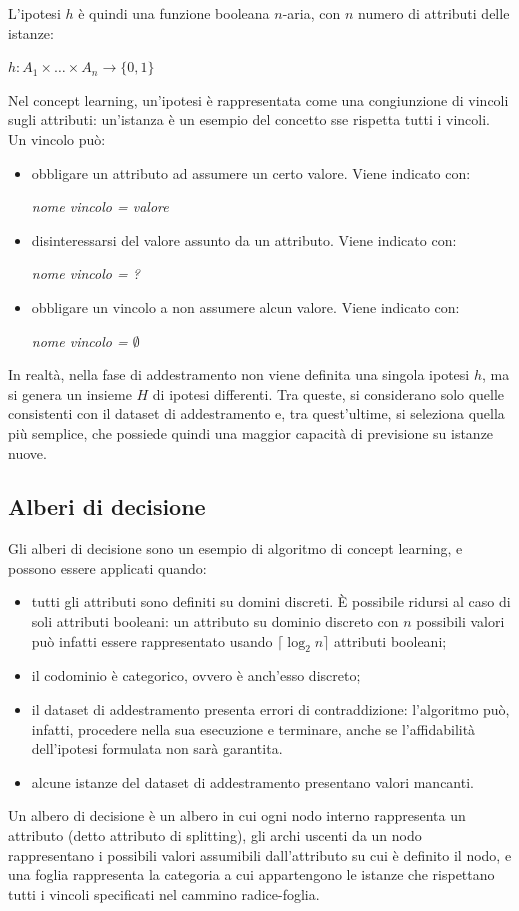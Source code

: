 L'ipotesi $h$ è quindi una funzione booleana $n$-aria, con $n$ numero di attributi delle istanze: 
\begin{center}
    $h: A_1 \times \ldots \times A_n \rightarrow \{ 0, 1 \}$
\end{center}
Nel concept learning, un'ipotesi è rappresentata come una congiunzione di vincoli sugli attributi: un'istanza è un esempio del concetto sse rispetta tutti i vincoli.
Un vincolo può:
\begin{itemize}
    \item obbligare un attributo ad assumere un certo valore. Viene indicato con:
    \begin{center}
        \textit{nome vincolo = valore}
    \end{center}
    \item disinteressarsi del valore assunto da un attributo. Viene indicato con:
    \begin{center}
        \textit{nome vincolo = ?}
    \end{center} 
    \item obbligare un vincolo a non assumere alcun valore. Viene indicato con:
    \begin{center}
        \textit{nome vincolo = $\emptyset$}
    \end{center}
\end{itemize}
In realtà, nella fase di addestramento non viene definita una singola ipotesi $h$, ma si genera un insieme $H$ di ipotesi differenti.
Tra queste, si considerano solo quelle consistenti con il dataset di addestramento e, tra quest'ultime, si seleziona quella più semplice, che possiede quindi una maggior capacità di previsione su istanze nuove.

\subsection{Alberi di decisione}
Gli alberi di decisione sono un esempio di algoritmo di concept learning, e possono essere applicati quando:
\begin{itemize}
    \item tutti gli attributi sono definiti su domini discreti. È possibile ridursi al caso di soli attributi booleani: un attributo su dominio discreto con $n$ possibili valori può infatti essere rappresentato usando $\lceil \log_2 n \rceil$ attributi booleani;
    \item il codominio è categorico, ovvero è anch'esso discreto;
    \item il dataset di addestramento presenta errori di contraddizione: l'algoritmo può, infatti, procedere nella sua esecuzione e terminare, anche se l'affidabilità dell'ipotesi formulata non sarà garantita.
    \item alcune istanze del dataset di addestramento presentano valori mancanti.
\end{itemize}
Un albero di decisione è un albero in cui ogni nodo interno rappresenta un attributo (detto attributo di splitting), gli archi uscenti da un nodo rappresentano i possibili valori assumibili dall'attributo su cui è definito il nodo, e una foglia rappresenta la categoria a cui appartengono le istanze che rispettano tutti i vincoli specificati nel cammino radice-foglia.

